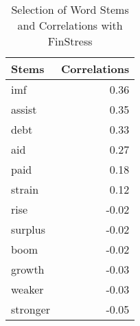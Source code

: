 \begin{table}[ht]
\centering
\caption{Selection of Word Stems and Correlations with FinStress} 
\label{stem_correlations}
\begin{tabular}{lr}
  \hline
Stems & Correlations \\ 
  \hline
imf & 0.36 \\ 
  assist & 0.35 \\ 
  debt & 0.33 \\ 
  aid & 0.27 \\ 
  paid & 0.18 \\ 
  strain & 0.12 \\ 
  rise & -0.02 \\ 
  surplus & -0.02 \\ 
  boom & -0.02 \\ 
  growth & -0.03 \\ 
  weaker & -0.03 \\ 
  stronger & -0.05 \\ 
   \hline
\end{tabular}
\end{table}
